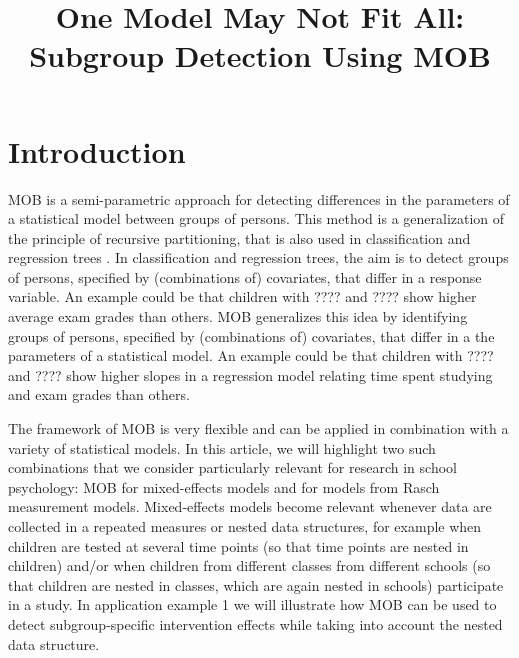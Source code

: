 \documentclass[doc,floatsintext,natbib]{apa7}
\title{One Model May Not Fit All: Subgroup Detection Using MOB}
\begin{document}

\renewenvironment{Schunk}{\small}{}


\maketitle





\newpage
\section{Introduction}
\label{sec:Introduction}

MOB \citep[MOB]{ZeilyHoth08} is a semi-parametric approach for detecting differences in the parameters of a statistical
model between groups of persons. This method is a generalization of the principle of recursive partitioning, that is also used in classification and regression trees \citet{Breetal:1984}. 
In classification and regression trees, the aim is to detect groups of persons, specified by (combinations of) covariates, that differ in a response variable. An example could be that children with ???? and ???? show higher average exam grades than others. 
MOB generalizes this idea by identifying groups of persons, specified by (combinations of) covariates, that differ in a the parameters of a statistical model. An example could be that children with ???? and ???? show higher slopes in a regression model relating time spent studying and exam grades than others. 

The framework of MOB is very flexible and can be applied in combination with a variety of statistical models. In this article, we will highlight two such combinations that we consider particularly relevant for research in school psychology: MOB for mixed-effects models and for models from Rasch measurement models. Mixed-effects models become relevant whenever data are collected in a repeated measures or nested data structures, for example when children are tested at several time points (so that time points are nested in children) and/or when children from different classes from different schools (so that children are nested in classes, which are again nested in schools) participate in a study. In application example 1 we will illustrate how MOB can be used to detect subgroup-specific intervention effects while taking into account the nested data structure. 
\end{document}
